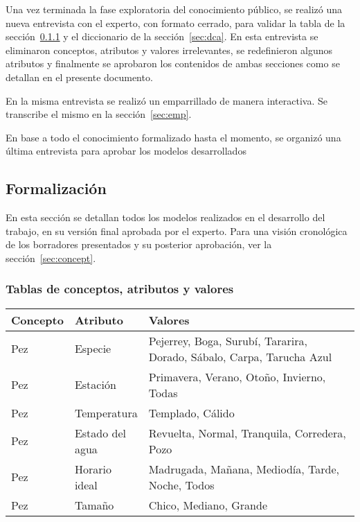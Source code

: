 \documentclass[a4paper,11pt]{article}
\begin{document}
Una vez terminada la fase exploratoria del conocimiento público, se realizó una
nueva entrevista con el experto, con formato cerrado, para validar la tabla de
la sección~\ref{sec:tcav} y el diccionario de la sección~\ref{sec:dca}. En esta
entrevista se eliminaron conceptos, atributos y valores irrelevantes, se
redefinieron algunos atributos y finalmente se aprobaron los contenidos de
ambas secciones como se detallan en el presente documento.

En la misma entrevista se realizó un emparrillado de manera interactiva. Se
transcribe el mismo en la sección~\ref{sec:emp}.

En base a todo el conocimiento formalizado hasta el momento, se organizó una
última entrevista para aprobar los modelos desarrollados

\subsection{Formalización}

En esta sección se detallan todos los modelos realizados en el desarrollo del
trabajo, en su versión final aprobada por el experto. Para una visión
cronológica de los borradores presentados y su posterior aprobación, ver la
sección~\ref{sec:concept}.

\subsubsection{Tablas de conceptos, atributos y valores}\label{sec:tcav}

\begin{table}[h!]
\centering
\begin{tabular}{ | p{0.15\linewidth} | p{0.2\linewidth} | p{0.65\linewidth} | }
  \hline
  \textbf{Concepto} & \textbf{Atributo} & \textbf{Valores} \\ \hline
  Pez & Especie & Pejerrey, Boga, Surubí, Tararira, Dorado, Sábalo, Carpa, Tarucha Azul \\\hline
  Pez & Estación & Primavera, Verano, Otoño, Invierno, Todas \\\hline
  Pez & Temperatura & Templado, Cálido \\\hline
  Pez & Estado del agua & Revuelta, Normal, Tranquila, Corredera, Pozo \\\hline
  Pez & Horario ideal & Madrugada, Mañana, Mediodía, Tarde, Noche, Todos \\\hline
  Pez & Tamaño & Chico, Mediano, Grande \\\hline
\end{tabular}
\end{table}
\end{document}
